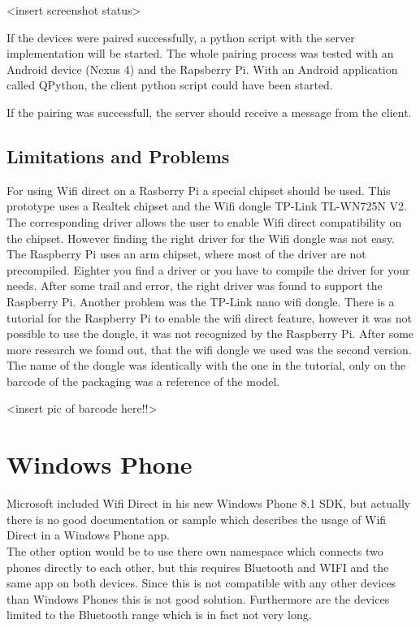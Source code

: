 <insert screenshot status>

If the devices were paired successfully, a python script with the server implementation will be started.
The whole pairing process was tested with an Android device (Nexus 4) and the Rapsberry Pi. With an Android application called QPython, the client python script could have been started.

If the pairing was successfull, the server should receive a message from the client.

\subsection*{Limitations and Problems}
\label{subsec:RaspberryLimitationsProblems}
For using Wifi direct on a Rasberry Pi a special chipset should be used. This prototype uses a Realtek chipset and the Wifi dongle TP-Link TL-WN725N V2. The corresponding driver allows the user to enable Wifi direct compatibility on the chipset. However finding the right driver for the Wifi dongle was not easy. The Raspberry Pi uses an arm chipset, where most of the driver are not precompiled. Eighter you find a driver or you have to compile the driver for your needs. After some trail and error, the right driver was found to support the Raspberry Pi. Another problem was the TP-Link nano wifi dongle. There is  a tutorial for the Raspberry Pi to enable the wifi direct feature, however it was not possible to use the dongle, it was not recognized by the Raspberry Pi. After some more research we found out, that the wifi dongle we used was the second version. The name of the dongle was identically with the one in the tutorial, only on the barcode of the packaging was a reference of the model.

<insert pic of barcode here!!>




\section{Windows Phone}
\label{sec:WindowsPhone}
Microsoft included Wifi Direct in his new Windows Phone 8.1 SDK, but actually there is no good documentation or sample which describes the usage of Wifi Direct in a Windows Phone app.\\
The other option would be to use there own namespace which connects two phones directly to each other, but this requires Bluetooth and WIFI and the same app on both devices. Since this is not compatible with any other devices than Windows Phones this is not good solution. Furthermore are the devices limited to the Bluetooth range which is in fact not very long.
